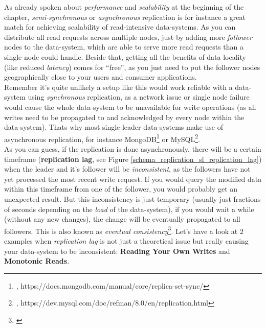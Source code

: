 {As already spoken about \textit{performance} and \textit{scalability} at the beginning of the chapter, \textit{semi-synchronous} or \textit{asynchronous} replication is for instance a great match for achieving scalability of read-intensive data-systems. As you can distribute all read requests across multiple nodes, just by adding more \textit{follower} nodes to the data-system, which are able to serve more read requests than a single node could handle. Beside that, getting all the benefits of data locality (like reduced \textit{latency}) comes for ``free'', as you just need to put the follower nodes geographically close to your users and consumer applications. \\
Remember it's quite unlikely a setup like this would work reliable with a data-system using \textit{synchronous} replication, as a network issue or single node failure would cause the whole data-system to be unavailable for write operations (as all writes need to be propagated to and acknowledged by every node within the data-system). Thats why most single-leader data-systems make use of asynchronous replication, for instance MongoDB\footnote{\cite{MDBASYNC}, https://docs.mongodb.com/manual/core/replica-set-sync/} or MySQL\footnote{\cite{MYSQLASYNC}, https://dev.mysql.com/doc/refman/8.0/en/replication.html}.\\

As you can guess, if the replication is done asynchronously, there will be a certain timeframe (\textbf{replication lag}, see Figure \ref{schema_replication_sl_replication_lag}) when the leader and it's follower will be \textit{inconsistent}, as the followers have not yet processed the most recent write request. If you would query the modified data within this timeframe from one of the follower, you would probably get an unexpected result. But this inconsistency is just temporary (usually just fractions of seconds depending on the \textit{load} of the data-system), if you would wait a while (without any new changes), the change will be eventually propagated to all followers. This is also known as \textit{eventual consistency}\footnote{\cite{DBEC}}. Let's have a look at 2 examples when \textit{replication lag} is not just a theoretical issue but really causing your data-system to be inconsistent: \textbf{Reading Your Own Writes} and \textbf{Monotonic Reads}.\\

}

